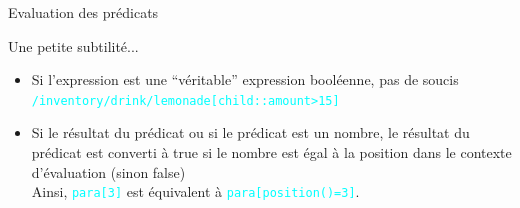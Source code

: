 \begin{frame}{Evaluation des prédicats}

Une petite subtilité...

\begin{itemize}
\item Si l'expression est une ``véritable'' expression booléenne, pas de soucis\\
\textcolor{cyan}{\verb?/inventory/drink/lemonade[child::amount>15]?}
\item Si le résultat du prédicat ou si le prédicat est un nombre, le résultat du prédicat est converti à true si le nombre est égal à la position dans le contexte d'évaluation (sinon false)\\
Ainsi, \textcolor{cyan}{\verb?para[3]?} est équivalent à \textcolor{cyan}{\verb?para[position()=3]?}.
\end{itemize}
\end{frame}


